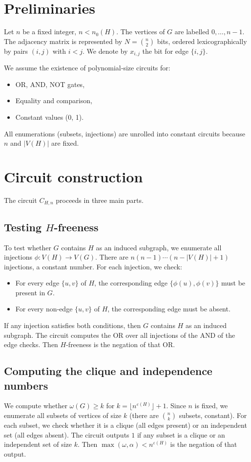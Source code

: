 \documentclass[11pt,a4paper]{article}
\begin{document}
\section{Preliminaries}
Let $n$ be a fixed integer, $n < n_0(H)$. The vertices of $G$ are labelled $0,\dots,n-1$. The adjacency matrix is represented by $N = \binom{n}{2}$ bits, ordered lexicographically by pairs $(i,j)$ with $i<j$. We denote by $x_{i,j}$ the bit for edge $\{i,j\}$.

We assume the existence of polynomial‑size circuits for:
\begin{itemize}
\item OR, AND, NOT gates,
\item Equality and comparison,
\item Constant values (0, 1).
\end{itemize}
All enumerations (subsets, injections) are unrolled into constant circuits because $n$ and $|V(H)|$ are fixed.

\section{Circuit construction}
The circuit $C_{H,n}$ proceeds in three main parts.

\subsection{Testing $H$-freeness}
To test whether $G$ contains $H$ as an induced subgraph, we enumerate all injections $\phi: V(H) \to V(G)$. There are $n(n-1)\cdots(n-|V(H)|+1)$ injections, a constant number. For each injection, we check:
\begin{itemize}
\item For every edge $\{u,v\}$ of $H$, the corresponding edge $\{\phi(u),\phi(v)\}$ must be present in $G$.
\item For every non‑edge $\{u,v\}$ of $H$, the corresponding edge must be absent.
\end{itemize}
If any injection satisfies both conditions, then $G$ contains $H$ as an induced subgraph. The circuit computes the OR over all injections of the AND of the edge checks. Then $H$-freeness is the negation of that OR.

\subsection{Computing the clique and independence numbers}
We compute whether $\omega(G) \ge k$ for $k = \lfloor n^{\varepsilon(H)}\rfloor + 1$. Since $n$ is fixed, we enumerate all subsets of vertices of size $k$ (there are $\binom{n}{k}$ subsets, constant). For each subset, we check whether it is a clique (all edges present) or an independent set (all edges absent). The circuit outputs $1$ if any subset is a clique or an independent set of size $k$. Then $\max(\omega,\alpha) < n^{\varepsilon(H)}$ is the negation of that output.
\end{document}
